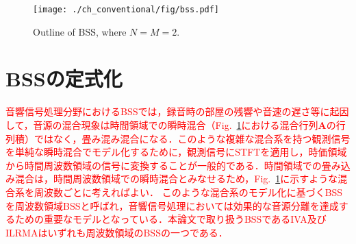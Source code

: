 \begin{figure}[!t]
\centering
\texttt{[image: ./ch\_conventional/fig/bss.pdf]}
\caption{Outline of BSS, where $N=M=2$.}
\label{fig:bss}
\end{figure}


\section{BSSの定式化}
\label{sec:conv:bssformularization}

\textcolor{red}{音響信号処理分野におけるBSSでは，録音時の部屋の残響や音速の遅さ等に起因して，音源の混合現象は時間領域での瞬時混合（Fig.~\ref{fig:bss}における混合行列$\bm{A}$の行列積）ではなく，畳み混み混合になる．このような複雑な混合系を持つ観測信号を単純な瞬時混合でモデル化するために，観測信号にSTFTを適用し，時価領域から時間周波数領域の信号に変換することが一般的である．時間領域での畳み込み混合は，時間周波数領域での瞬時混合とみなせるため，Fig.~\ref{fig:bss}に示すような混合系を周波数ごとに考えればよい．
このような混合系のモデル化に基づくBSSを周波数領域BSSと呼ばれ，音響信号処理においては効果的な音源分離を達成するための重要なモデルとなっている．本論文で取り扱うBSSであるIVA及びILRMAはいずれも周波数領域のBSSの一つである．}

